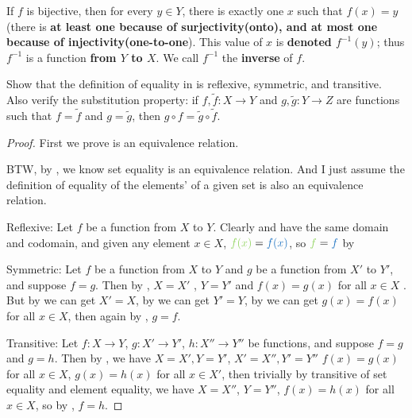 If \(f\) is bijective, then for every \(y \in Y\), there is exactly one \(x\) such that \(f(x) = y\) (there is \textbf{at least one because of surjectivity(onto),
and at most one because of injectivity(one-to-one}).
This value of \(x\) is \textbf{denoted \(f^{-1}(y)\)}; thus \(f^{-1}\) is a function \textbf{from \(Y\) to \(X\)}. We call \(f^{-1}\) the \textbf{inverse} of \(f\).

\exercisesection

\begin{exercise} \label{exercise 3.3.1}
Show that the definition of equality in  is reflexive, symmetric, and transitive.
Also verify the substitution property: if \(f, \tilde{f} : X \rightarrow Y\) and \(g, \tilde{g} : Y \rightarrow Z\) are functions such that \(f = \tilde{f}\) and \(g = \tilde{g}\), then \(g \circ f = \tilde{g} \circ \tilde{f}\).
\end{exercise}

\begin{proof}
First we prove  is an equivalence relation.

BTW, by , we know set equality is an equivalence relation. And I just assume the definition of equality of the elements' of a given set is also an equivalence relation.

Reflexive: Let \(f\) be a function from \(X\) to \(Y\).
Clearly  and  have the same domain and codomain, and given any element \(x \in X\), \(\GREEN{f(x)} = \BLUE{f(x)}\), so \(\GREEN{f} = \BLUE{f}\) by 

Symmetric: Let \(f\) be a function from \(X\) to \(Y\) and \(g\) be a function from \(X'\) to \(Y'\), and suppose \(f = g\).
Then by , \(X = X'\) , \(Y = Y'\)  and \(f(x) = g(x)\) for all \(x \in X\) .
But by  we can get \(X' = X\), by  we can get \(Y' = Y\), by  we can get \(g(x) = f(x)\) for all \(x \in X\), then again by , \(g = f\).

Transitive: Let \(f : X \rightarrow Y\), \(g : X' \rightarrow Y'\), \(h : X'' \rightarrow Y''\) be functions, and suppose \(f = g\) and \(g = h\).
Then by , we have \(X = X', Y = Y'\), \(X' = X'', Y' = Y''\) \(f(x) = g(x)\) for all \(x \in X\), \(g(x) = h(x)\) for all \(x \in X'\),
then trivially by transitive of set equality and element equality, we have \(X = X''\), \(Y = Y''\), \(f(x) = h(x)\) for all \(x \in X\), so by , \(f = h\).
\end{proof}

